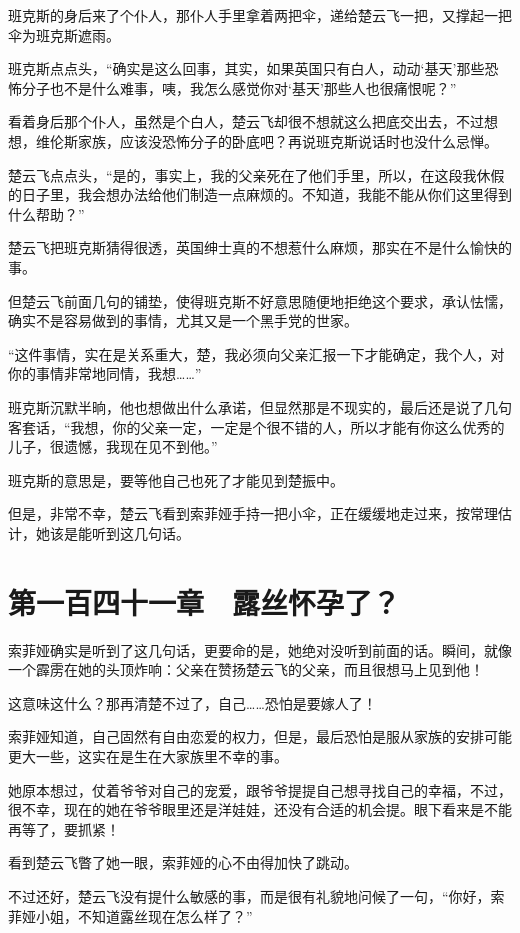 班克斯的身后来了个仆人，那仆人手里拿着两把伞，递给楚云飞一把，又撑起一把伞为班克斯遮雨。

班克斯点点头，“确实是这么回事，其实，如果英国只有白人，动动‘基天’那些恐怖分子也不是什么难事，咦，我怎么感觉你对‘基天’那些人也很痛恨呢？”

看着身后那个仆人，虽然是个白人，楚云飞却很不想就这么把底交出去，不过想想，维伦斯家族，应该没恐怖分子的卧底吧？再说班克斯说话时也没什么忌惮。

楚云飞点点头，“是的，事实上，我的父亲死在了他们手里，所以，在这段我休假的日子里，我会想办法给他们制造一点麻烦的。不知道，我能不能从你们这里得到什么帮助？”

楚云飞把班克斯猜得很透，英国绅士真的不想惹什么麻烦，那实在不是什么愉快的事。

但楚云飞前面几句的铺垫，使得班克斯不好意思随便地拒绝这个要求，承认怯懦，确实不是容易做到的事情，尤其又是一个黑手党的世家。

“这件事情，实在是关系重大，楚，我必须向父亲汇报一下才能确定，我个人，对你的事情非常地同情，我想……”

班克斯沉默半晌，他也想做出什么承诺，但显然那是不现实的，最后还是说了几句客套话，“我想，你的父亲一定，一定是个很不错的人，所以才能有你这么优秀的儿子，很遗憾，我现在见不到他。”

班克斯的意思是，要等他自己也死了才能见到楚振中。

但是，非常不幸，楚云飞看到索菲娅手持一把小伞，正在缓缓地走过来，按常理估计，她该是能听到这几句话。

\section{第一百四十一章　露丝怀孕了？}

索菲娅确实是听到了这几句话，更要命的是，她绝对没听到前面的话。瞬间，就像一个霹雳在她的头顶炸响：父亲在赞扬楚云飞的父亲，而且很想马上见到他！

这意味这什么？那再清楚不过了，自己……恐怕是要嫁人了！

索菲娅知道，自己固然有自由恋爱的权力，但是，最后恐怕是服从家族的安排可能更大一些，这实在是生在大家族里不幸的事。

她原本想过，仗着爷爷对自己的宠爱，跟爷爷提提自己想寻找自己的幸福，不过，很不幸，现在的她在爷爷眼里还是洋娃娃，还没有合适的机会提。眼下看来是不能再等了，要抓紧！

看到楚云飞瞥了她一眼，索菲娅的心不由得加快了跳动。

不过还好，楚云飞没有提什么敏感的事，而是很有礼貌地问候了一句，“你好，索菲娅小姐，不知道露丝现在怎么样了？”

